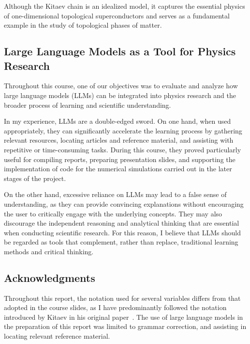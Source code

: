 \documentclass[11pt, a4paper]{article}
\numberwithin{equation}{section}
\begin{document}
Although the Kitaev chain is an idealized model, it captures the essential physics of one-dimensional topological superconductors and serves as a fundamental example in the study of topological phases of matter. 
\subsection{Large Language Models as a Tool for Physics Research}

Throughout this course, one of our objectives was to evaluate and analyze how large language models (LLMs) can be integrated into physics research and the broader process of learning and scientific understanding.

In my experience, LLMs are a double-edged sword. On one hand, when used appropriately, they can significantly accelerate the learning process by gathering relevant resources, locating articles and reference material, and assisting with repetitive or time-consuming tasks. During this course, they proved particularly useful for compiling reports, preparing presentation slides, and supporting the implementation of code for the numerical simulations carried out in the later stages of the project.

On the other hand, excessive reliance on LLMs may lead to a false sense of understanding, as they can provide convincing explanations without encouraging the user to critically engage with the underlying concepts. They may also discourage the independent reasoning and analytical thinking that are essential when conducting scientific research. For this reason, I believe that LLMs should be regarded as tools that complement, rather than replace, traditional learning methods and critical thinking.

\subsection{Acknowledgments}

Throughout this report, the notation used for several variables differs from that adopted in the course slides, as I have predominantly followed the notation introduced by Kitaev in his original paper~\cite{Kitaev2000}. 
The use of large language models in the preparation of this report was limited to grammar correction, and assisting in locating relevant reference material.

\newpage
\printbibliography
\end{document}
